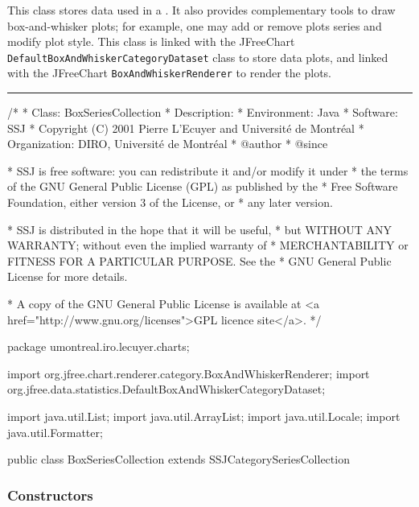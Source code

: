 
This class stores data used in a 
.
It also provides complementary tools to draw
 box-and-whisker plots; for example, one may
add or remove plots series and modify plot style. This class is linked with 
the JFreeChart \texttt{DefaultBoxAndWhiskerCategoryDataset} class to store 
data plots, and linked with the JFreeChart
\texttt{BoxAndWhiskerRenderer} to render the plots.

\bigskip\hrule
\begin{code}
\begin{hide}
/*
 * Class:        BoxSeriesCollection
 * Description:  
 * Environment:  Java
 * Software:     SSJ 
 * Copyright (C) 2001  Pierre L'Ecuyer and Université de Montréal
 * Organization: DIRO, Université de Montréal
 * @author       
 * @since

 * SSJ is free software: you can redistribute it and/or modify it under
 * the terms of the GNU General Public License (GPL) as published by the
 * Free Software Foundation, either version 3 of the License, or
 * any later version.

 * SSJ is distributed in the hope that it will be useful,
 * but WITHOUT ANY WARRANTY; without even the implied warranty of
 * MERCHANTABILITY or FITNESS FOR A PARTICULAR PURPOSE.  See the
 * GNU General Public License for more details.

 * A copy of the GNU General Public License is available at
   <a href="http://www.gnu.org/licenses">GPL licence site</a>.
 */
\end{hide}
package umontreal.iro.lecuyer.charts;\begin{hide}

import   org.jfree.chart.renderer.category.BoxAndWhiskerRenderer;
import   org.jfree.data.statistics.DefaultBoxAndWhiskerCategoryDataset;

import   java.util.List;
import   java.util.ArrayList;
import   java.util.Locale;
import   java.util.Formatter;
\end{hide}

public class BoxSeriesCollection extends SSJCategorySeriesCollection \begin{hide} {
   final double BARWIDTH = 0.1;
\end{hide}
\end{code}

\subsubsection*{Constructors}

